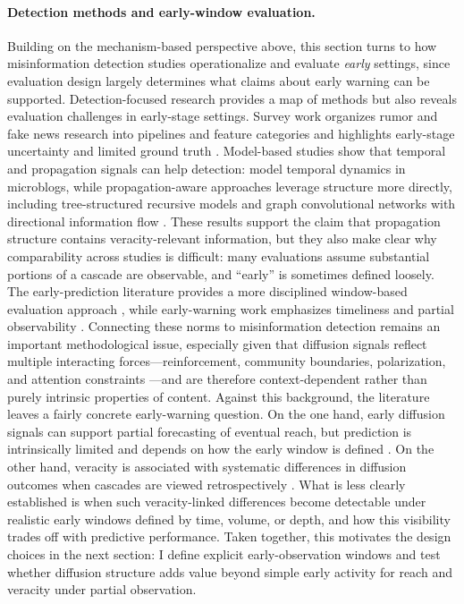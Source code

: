 \paragraph{Detection methods and early-window evaluation.}
Building on the mechanism-based perspective above, this section turns to how misinformation detection studies operationalize and evaluate \emph{early} settings, since evaluation design largely determines what claims about early warning can be supported. Detection-focused research provides a map of methods but also reveals evaluation challenges in early-stage settings. Survey work organizes rumor and fake news research into pipelines and feature categories and highlights early-stage uncertainty and limited ground truth \citep{shu_fake_2017, zubiaga_detection_2018}. Model-based studies show that temporal and propagation signals can help detection: \citet{ma_detecting_2016} model temporal dynamics in microblogs, while propagation-aware approaches leverage structure more directly, including tree-structured recursive models \citep{ma_tree_rnn_2018} and graph convolutional networks with directional information flow \citep{bian_bigcn_2020}. These results support the claim that propagation structure contains veracity-relevant information, but they also make clear why comparability across studies is difficult: many evaluations assume substantial portions of a cascade are observable, and ``early'' is sometimes defined loosely. The early-prediction literature provides a more disciplined window-based evaluation approach \citep{cheng_can_2014}, while early-warning work emphasizes timeliness and partial observability \citep{colbaugh_earlywarning_2012}. Connecting these norms to misinformation detection remains an important methodological issue, especially given that diffusion signals reflect multiple interacting forces---reinforcement, community boundaries, polarization, and attention constraints \citep{centola_spread_2010, lerman_information_2016, del_vicario_spreading_2016}---and are therefore context-dependent rather than purely intrinsic properties of content. Against this background, the literature leaves a fairly concrete early-warning question. On the one hand, early diffusion signals can support partial forecasting of eventual reach, but prediction is intrinsically limited and depends on how the early window is defined \citep{szabo_predicting_2010, cheng_can_2014, bakshy_everyones_2011}. On the other hand, veracity is associated with systematic differences in diffusion outcomes when cascades are viewed retrospectively \citep{vosoughi_spread_2018, del_vicario_spreading_2016}. What is less clearly established is when such veracity-linked differences become detectable under realistic early windows defined by time, volume, or depth, and how this visibility trades off with predictive performance. Taken together, this motivates the design choices in the next section: I define explicit early-observation windows and test whether diffusion structure adds value beyond simple early activity for reach and veracity under partial observation.

